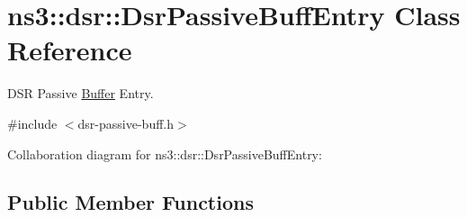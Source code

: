 \hypertarget{classns3_1_1dsr_1_1DsrPassiveBuffEntry}{}\section{ns3\+:\+:dsr\+:\+:Dsr\+Passive\+Buff\+Entry Class Reference}
\label{classns3_1_1dsr_1_1DsrPassiveBuffEntry}


D\+SR Passive \hyperlink{classns3_1_1Buffer}{Buffer} Entry.  




{\ttfamily \#include $<$dsr-\/passive-\/buff.\+h$>$}



Collaboration diagram for ns3\+:\+:dsr\+:\+:Dsr\+Passive\+Buff\+Entry\+:
\subsection*{Public Member Functions}
